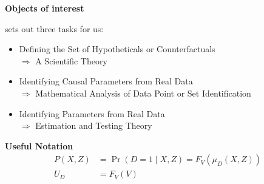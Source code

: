 \begin{frame}\begin{center}
	\LARGE\textbf{Objects of interest}
\end{center}\end{frame}
\begin{frame}
	 sets out three tasks for us:
	\begin{itemize}\setlength\itemsep{1em}
		\item Defining the Set of Hypotheticals or Counterfactuals \\\hspace{0.3cm}
		$\Rightarrow$ A Scientific Theory
		\item Identifying Causal Parameters from Real Data \\\hspace{0.3cm}
		$\Rightarrow$ Mathematical Analysis of  Data Point or Set Identification
		\item Identifying Parameters from Real Data\\\hspace{0.3cm}
		$\Rightarrow$ Estimation and Testing Theory
	\end{itemize}
\end{frame}
\begin{frame}
	\textbf{Useful Notation}
	\begin{align*}
		P(X, Z) & = \Pr(D = 1\mid X, Z) = F_V(\mu_D(X, Z)) \\
		U_D     & = F_V(V)
	\end{align*}
\end{frame}
